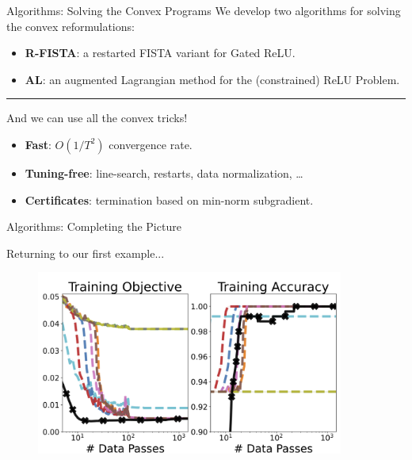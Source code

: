 \documentclass[usenames,dvipsnames,mathserif,notheorems]{beamer}
\newcommand{\horizontalrule}{
	{
			\vspace{-0.5em}
			\center \rule{\textwidth}{0.1em}
			\vspace{-0.2em}
		}
}
\begin{document}
\begin{frame}{Algorithms: Solving the Convex Programs}
	We develop two algorithms for solving the convex reformulations:

	\vspace{1em}

	\begin{itemize}
		\item \textbf{R-FISTA}: a restarted FISTA variant for Gated ReLU.
		      \vspace{0.5em}
		\item \textbf{AL}: an augmented Lagrangian method for the (constrained) ReLU Problem.
	\end{itemize}

	\pause
	\horizontalrule

	And we can use all the convex tricks!
	\vspace{1em}
	\begin{itemize}
		\item \textbf{Fast}: \( O(1/T^2) \) convergence rate.
		      \vspace{0.5em}

		\item \textbf{Tuning-free}: line-search, restarts, data normalization, \ldots
		      \vspace{0.5em}

		\item \textbf{Certificates}: termination based on min-norm subgradient.
	\end{itemize}

\end{frame}

\begin{frame}{Algorithms: Completing the Picture}
	\begin{center}
		\Large
		Returning to our first example...
	\end{center}

	\begin{figure}[]
		\centering
		\includegraphics[width=0.9\textwidth]{assets/synthetic_classification.png}
	\end{figure}
\end{frame}
\end{document}
